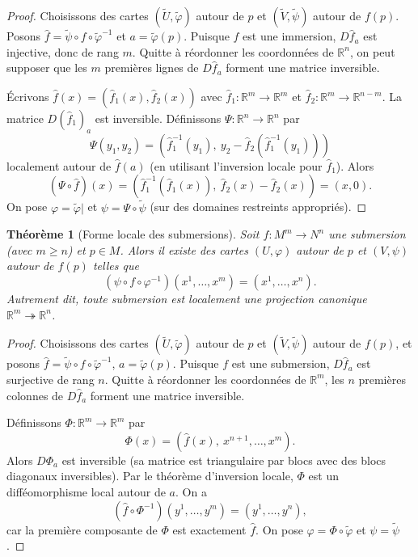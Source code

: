 \documentclass[12pt,a4paper,openany]{book}
\theoremstyle{definition}
\theoremstyle{plain}
\newtheorem{theoreme}[definition]{Théorème}
\theoremstyle{remark}
\newcommand{\R}{\mathbb{R}}
\begin{document}
\begin{proof}
Choisissons des cartes $(\tilde{U}, \tilde{\varphi})$ autour de $p$ et
$(\tilde{V}, \tilde{\psi})$ autour de $f(p)$. Posons $\hat{f} = \tilde{\psi}
\circ f \circ \tilde{\varphi}^{-1}$ et $a = \tilde{\varphi}(p)$. Puisque $f$
est une immersion, $D\hat{f}_a$ est injective, donc de rang $m$. Quitte à
réordonner les coordonnées de $\R^n$, on peut supposer que les $m$ premières
lignes de $D\hat{f}_a$ forment une matrice inversible.

Écrivons $\hat{f}(x) = (\hat{f}_1(x), \hat{f}_2(x))$ avec $\hat{f}_1 \colon
\R^m \to \R^m$ et $\hat{f}_2 \colon \R^m \to \R^{n-m}$. La matrice
$D(\hat{f}_1)_a$ est inversible. Définissons $\Psi \colon \R^n \to \R^n$ par
\[
    \Psi(y_1, y_2) = (\hat{f}_1^{-1}(y_1),\ y_2 - \hat{f}_2(\hat{f}_1^{-1}(y_1)))
\]
localement autour de $\hat{f}(a)$ (en utilisant l'inversion locale pour
$\hat{f}_1$). Alors
\[
    (\Psi \circ \hat{f})(x) = (\hat{f}_1^{-1}(\hat{f}_1(x)),\ \hat{f}_2(x) -
    \hat{f}_2(x)) = (x, 0).
\]
On pose $\varphi = \tilde{\varphi}|$ et $\psi = \Psi \circ \tilde{\psi}$
(sur des domaines restreints appropriés).
\end{proof}

\begin{theoreme}[Forme locale des submersions]\label{thm:forme-locale-submersion}
Soit $f \colon M^m \to N^n$ une submersion (avec $m \geq n$) et $p \in M$.
Alors il existe des cartes $(U, \varphi)$ autour de $p$ et $(V, \psi)$ autour
de $f(p)$ telles que
\[
    (\psi \circ f \circ \varphi^{-1})(x^1, \ldots, x^m)
    = (x^1, \ldots, x^n).
\]
Autrement dit, toute submersion est localement une projection canonique $\R^m
\twoheadrightarrow \R^n$.
\end{theoreme}

\begin{proof}
Choisissons des cartes $(\tilde{U}, \tilde{\varphi})$ autour de $p$ et
$(\tilde{V}, \tilde{\psi})$ autour de $f(p)$, et posons $\hat{f} = \tilde{\psi}
\circ f \circ \tilde{\varphi}^{-1}$, $a = \tilde{\varphi}(p)$. Puisque $f$
est une submersion, $D\hat{f}_a$ est surjective de rang $n$. Quitte à
réordonner les coordonnées de $\R^m$, les $n$ premières colonnes de
$D\hat{f}_a$ forment une matrice inversible.

Définissons $\Phi \colon \R^m \to \R^m$ par
\[
    \Phi(x) = (\hat{f}(x),\ x^{n+1}, \ldots, x^m).
\]
Alors $D\Phi_a$ est inversible (sa matrice est triangulaire par blocs avec des
blocs diagonaux inversibles). Par le théorème d'inversion locale, $\Phi$ est
un difféomorphisme local autour de $a$. On a
\[
    (\hat{f} \circ \Phi^{-1})(y^1, \ldots, y^m) = (y^1, \ldots, y^n),
\]
car la première composante de $\Phi$ est exactement $\hat{f}$. On pose
$\varphi = \Phi \circ \tilde{\varphi}$ et $\psi = \tilde{\psi}$.
\end{proof}
\end{document}

